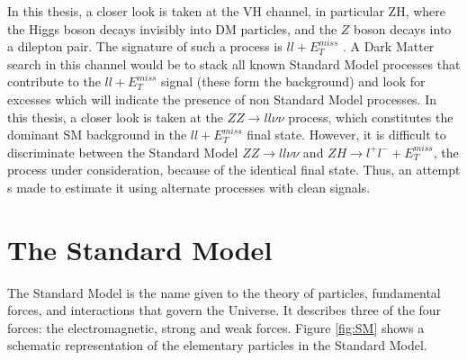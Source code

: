 \documentclass[11pt,a4paper]{report}
\newcommand{\ZZ}{$ZZ\to ll\nu\nu$ }
\newcommand{\llM}{$ll+E_T^{miss}$ }
\begin{document}
In this thesis, a closer look is taken at the VH channel, in particular ZH, where the Higgs boson decays invisibly into DM particles, and the $Z$ boson decays into a dilepton pair. The signature of such a process is \llM. A Dark Matter search in this channel would be to stack all known Standard Model processes that contribute to the \llM signal (these form the background) and look for excesses which will indicate the presence of non Standard Model processes. In this thesis, a closer look is taken at the \ZZ process, which constitutes the dominant SM background in the \llM final state. However, it is difficult to discriminate between the Standard Model \ZZ and $ZH\to l^+l^-+E_T^{miss}$, the process under consideration, because of the identical final state. Thus, an attempt s made to estimate it using alternate processes with clean signals.

\section{The Standard Model}
The Standard Model is the name given to the theory of particles, fundamental forces, and interactions that govern the Universe. It describes three of the four forces: the electromagnetic, strong and weak forces. Figure \ref{fig:SM} shows a schematic representation of the elementary particles in the Standard Model.
\end{document}
